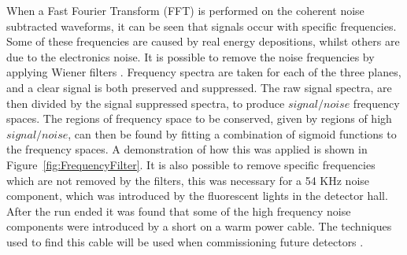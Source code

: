 When a Fast Fourier Transform (FFT) \citep{CoTuFFT} is performed on the coherent noise subtracted waveforms, it can be seen that signals occur with specific frequencies. Some of these frequencies are caused by real energy depositions, whilst others are due to the electronics noise. It is possible to remove the noise frequencies by applying Wiener filters \citep{WienerFilter}. Frequency spectra are taken for each of the three planes, and a clear signal is both preserved and suppressed. The raw signal spectra, are then divided by the signal suppressed spectra, to produce $signal/noise$ frequency spaces. The regions of frequency space to be conserved, given by regions of high $signal/noise$, can then be found by fitting a combination of sigmoid functions to the frequency spaces. A demonstration of how this was applied is shown in Figure~\ref{fig:FrequencyFilter}. It is also possible to remove specific frequencies which are not removed by the filters, this was necessary for a 54 KHz noise component, which was introduced by the fluorescent lights in the detector hall. After the run ended it was found that some of the high frequency noise components were introduced by a short on a warm power cable. The techniques used to find this cable will be used when commissioning future detectors \citep{35tonNoiseMeeting}. \\

